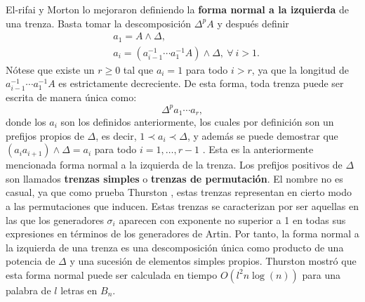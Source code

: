 \documentclass[bibtex, anon]{TEMat-article}
\begin{document}
El-rifai y Morton \cite{EM} lo mejoraron definiendo la \textbf{forma normal a la izquierda} de una trenza. Basta tomar la descomposición $\Delta^pA$ y después definir %
\begin{align*}
&a_1=A\land\Delta,\\
&a_i=(a_{i-1}^{-1}\cdots a_1^{-1}A)\land\Delta,\ \forall\ i>1.
\end{align*}
Nótese que existe un $r\geq 0$ tal que $a_i=1$ para todo $i>r$, ya que la longitud de $a_{i-1}^{-1}\cdots a_1^{-1}A$ es estrictamente decreciente. De esta forma, toda trenza puede ser escrita de manera única como:
$$\Delta^p a_1\cdots a_r,$$
donde los $a_i$ son los definidos anteriormente, los cuales por definición son un prefijos propios de $\Delta$, es decir, $1\prec a_i\prec\Delta$, y además se puede demostrar que $(a_ia_{i+1})\land\Delta=a_i$ para todo $i=1,\dots, r-1$ \cite{Thurston}. Esta es la anteriormente mencionada forma normal a la izquierda de la trenza. Los prefijos positivos de $\Delta$ son llamados \textbf{trenzas simples} o \textbf{trenzas de permutación}. El nombre no es casual, ya que como prueba Thurston \cite{Thurston}, estas trenzas representan en cierto modo a las permutaciones que inducen. Estas trenzas se caracterizan por ser aquellas en las que los generadores $\sigma_i$ aparecen con exponente no superior a 1 en todas sus expresiones en términos de los generadores de Artin. Por tanto, la forma normal a la izquierda de una trenza es una descomposición única como producto de una potencia de $\Delta$ y una sucesión de elementos simples propios. Thurston \cite{Thurston} mostró que esta forma normal puede ser calculada en tiempo $O(l^2n\log(n))$ para una palabra de $l$ letras en $B_n$. 

\end{document}
